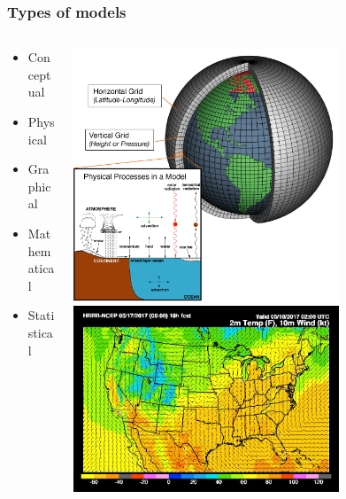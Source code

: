 \documentclass[color=usenames,dvipsnames]{beamer}\usepackage[]{graphicx}\usepackage[]{xcolor}
\begin{document}
\begin{frame}
  \frametitle{Types of models}
  \Large
  \begin{columns}
    \begin{column}{0.4\textwidth}
      \begin{itemize}
      \item { Conceptual}
      \item Physical
      \item Graphical
      \item {\color<2>{Red} Mathematical}
      \item { Statistical}
      \end{itemize}
    \end{column}
    \begin{column}[c]{0.6\textwidth}
      \centering
      \includegraphics[width=0.7\textwidth]{figs/atm-model} \\
      \includegraphics[width=0.7\textwidth]{figs/hrrr-model} \\
    \end{column}
  \end{columns}
\end{frame}
\end{document}
